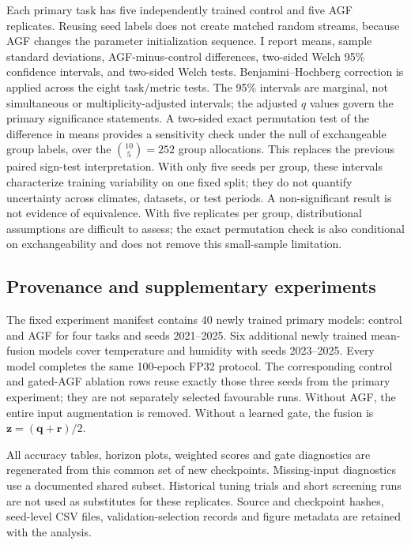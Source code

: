 \documentclass[fleqn,10pt]{wlscirep}
\begin{document}
Each primary task has five independently trained control and five AGF
replicates. Reusing seed labels does not create matched random streams,
because AGF changes the parameter initialization sequence. I report means,
sample standard deviations, AGF-minus-control differences, two-sided Welch
95\% confidence intervals, and two-sided Welch tests. Benjamini--Hochberg
correction is applied across the eight task/metric tests. The 95\% intervals are marginal, not simultaneous or multiplicity-adjusted intervals; the adjusted $q$ values govern the primary significance statements. A two-sided exact
permutation test of the difference in means provides a sensitivity check
under the null of exchangeable group labels, over the
$\binom{10}{5}=252$ group allocations. This
replaces the previous paired sign-test interpretation. With only five seeds
per group, these intervals characterize training variability on one fixed
split; they do not quantify uncertainty across climates, datasets, or test
periods. A non-significant result is not evidence of equivalence. With five replicates per group, distributional assumptions are difficult to assess; the exact permutation check is also conditional on exchangeability and does not remove this small-sample limitation.

\subsection{Provenance and supplementary experiments}\label{sec:provenance}
The fixed experiment manifest contains 40 newly trained primary models:
control and AGF for four tasks and seeds 2021--2025. Six additional newly
trained mean-fusion models cover temperature and humidity with seeds
2023--2025. Every model completes the same 100-epoch FP32 protocol.
The corresponding control and gated-AGF ablation rows reuse exactly those
three seeds from the primary experiment; they are not separately selected
favourable runs. Without AGF, the entire input augmentation is removed.
Without a learned gate, the fusion is $\mathbf z=(\mathbf q+\mathbf r)/2$.

All accuracy tables, horizon plots, weighted scores and gate diagnostics
are regenerated from this common set of new checkpoints. Missing-input
diagnostics use a documented shared subset. Historical tuning trials and
short screening runs are not used as substitutes for these replicates.
Source and checkpoint hashes, seed-level CSV files, validation-selection
records and figure metadata are retained with the analysis.
\end{document}

